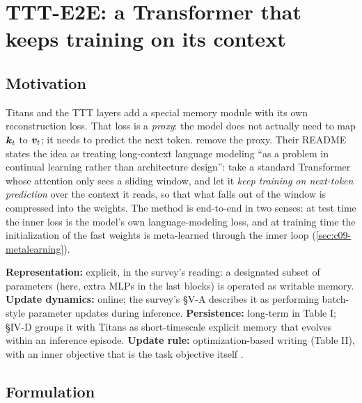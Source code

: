 \section{TTT-E2E: a Transformer that keeps training on its context}\label{sec:c09-e2e}

\subsection{Motivation}

Titans and the TTT layers add a special memory module with its own reconstruction loss. That
loss is a \emph{proxy}: the model does not actually need to map $\bm{k}_t$ to $\bm{v}_t$; it needs to
predict the next token. \citet{tandon2025ttte2e} remove the proxy. Their README states the idea
as treating long-context language modeling ``as a problem in continual learning rather than
architecture design'': take a standard Transformer whose attention only sees a sliding window,
and let it \emph{keep training on next-token prediction} over the context it reads, so that
what falls out of the window is compressed into the weights. The method is end-to-end in two
senses: at test time the inner loss is the model's own language-modeling loss, and at training
time the initialization of the fast weights is meta-learned through the inner loop
(\cref{sec:c09-metalearning}).

\begin{taxonomy}
\textbf{Representation:} explicit, in the survey's reading: a designated subset of parameters
(here, extra MLPs in the last blocks) is operated as writable memory. \textbf{Update dynamics:}
online; the survey's \S V-A describes it as performing batch-style parameter updates during
inference. \textbf{Persistence:} long-term in Table I; \S IV-D groups it with Titans as
short-timescale explicit memory that evolves within an inference episode. \textbf{Update rule:}
optimization-based writing (Table II), with an inner objective that is the task objective
itself \citep{zhoubian2026memory}.
\end{taxonomy}

\subsection{Formulation}


